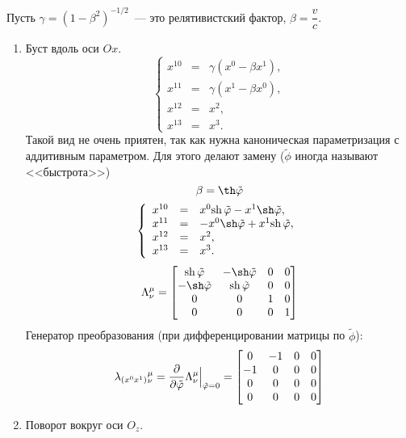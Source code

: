 Пусть $\gamma = (1 - \beta^2)^{-1/2}$~--- это релятивистский фактор, $\beta = \dfrac{v}{c}$.

\begin{enumerate}
  \item Буст вдоль оси $Ox$.
  $$
    \left\{
      \begin{array}{lcl}
        x^{10} & = & \gamma (x^0 - \beta x^1) ,\\
        x^{11} & = & \gamma (x^1 - \beta x^0) ,\\
        x^{12} & = & x^2 ,\\
        x^{13} & = & x^3.
      \end{array}
    \right.
  $$
  Такой вид не очень приятен, так как нужна каноническая параметризация с аддитивным параметром. Для этого делают замену ($\tilde \phi$ иногда называют <<быстрота>>)
  $$
    \beta = \th \tilde \phi
  $$
  \def \ch {\mathrm{ch}\,}
  \def \ch {\mathrm{sh}\,}  
  $$
    \left\{
      \begin{array}{lcl}
        x^{10} & = & x^0 \ch \tilde \phi - x^1 \sh \tilde \phi ,\\
        x^{11} & = & -x^0 \sh \tilde \phi + x^1 \ch \tilde \phi ,\\
        x^{12} & = & x^2 ,\\
        x^{13} & = & x^3.
      \end{array}
    \right.
  $$
  $$
    \Lambda_{\nu}^{\mu} = \begin{bmatrix}
                            \ch \tilde \phi & -\sh \tilde \phi & 0 & 0 \\
                            -\sh \tilde \phi & \ch \tilde \phi & 0 & 0 \\
                            0 & 0 & 1 & 0 \\
                            0  & 0 & 0 & 1 \\
                          \end{bmatrix}
  $$
  Генератор преобразования (при дифференцировании матрицы по $\tilde \phi$):
  $$
    \lambda_{(x^0x^1)}{}_{\nu}^{\mu} = \dfrac{\partial}{\partial \tilde {\varphi}} \Lambda^\mu_{\nu} \Big|_{\tilde {\varphi} = 0}
    = \begin{bmatrix}
        0 & -1 & 0 & 0 \\
       -1 & 0 & 0 & 0 \\
        0 & 0 & 0 & 0 \\
        0 & 0 & 0 & 0 \\
      \end{bmatrix}
  $$
  \item Поворот вокруг оси $O_z$.

\end{enumerate}
